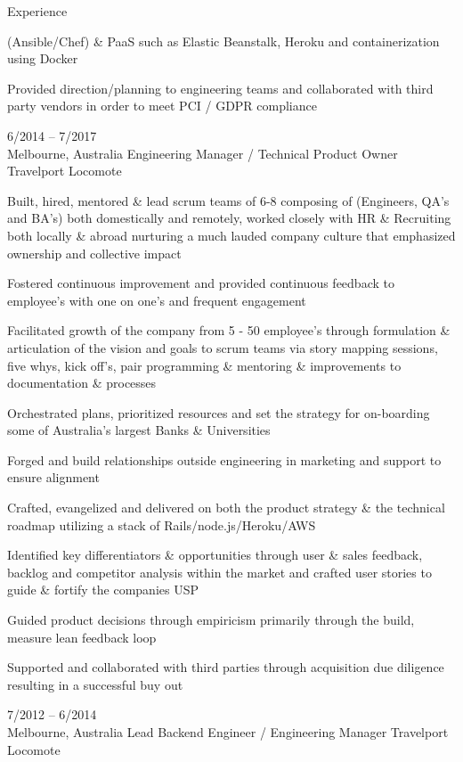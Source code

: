 \documentclass[9pt]{developercv} %
\begin{document}
\begin{cvsect}{Experience}
\begin{entrylist}
{      (Ansible/Chef) \& PaaS such as Elastic Beanstalk, Heroku and
      containerization using Docker
  \par\medskip Provided direction/planning to engineering teams and collaborated with third party vendors in order to meet PCI / GDPR compliance
      }
    \entry
      {6/2014 -- 7/2017\\\footnotesize{Melbourne, Australia}}
      {Engineering Manager / Technical Product Owner}
      {Travelport Locomote}
      {Built, hired, mentored \& lead scrum teams of 6-8  composing of (Engineers,
      QA’s and BA’s) both domestically and remotely, worked closely with HR \&
      Recruiting both locally \& abroad nurturing a much lauded company culture
      that emphasized ownership and collective impact
      \par\medskip Fostered continuous improvement and provided continuous feedback to employee’s with one on one’s and frequent engagement
      \par\medskip Facilitated growth of the company from 5 - 50 employee’s through formulation \& articulation of the vision and goals to scrum teams via story mapping sessions, five whys, kick off's, pair programming \& mentoring \& improvements to documentation \& processes
      \par\medskip Orchestrated plans, prioritized resources and set the strategy for on-boarding some of Australia’s largest Banks \& Universities
      \par\medskip Forged and build relationships outside engineering in marketing and support to ensure alignment
      \par\medskip Crafted, evangelized and delivered on both the product strategy \& the technical roadmap  utilizing a stack of  Rails/node.js/Heroku/AWS
      \par\medskip Identified key differentiators \& opportunities through user \& sales feedback, backlog and competitor analysis within the market and crafted user stories to guide \& fortify the companies USP
      \par\medskip Guided product decisions through empiricism primarily through the build, measure lean feedback loop
      \par\medskip Supported and collaborated with third parties through acquisition due diligence resulting in a successful buy out}
    \entry
      {7/2012 -- 6/2014\\\footnotesize{Melbourne, Australia}}
      {Lead Backend Engineer / Engineering Manager}
      {Travelport Locomote}

\end{entrylist}
\end{cvsect}
\end{document}
